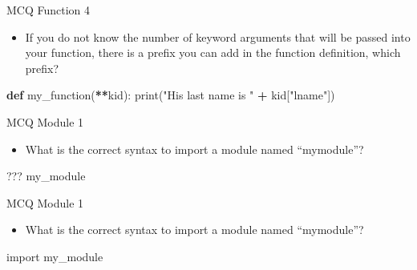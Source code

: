 \documentclass[
  8pt,
  ignorenonframetext,
]{beamer}
\newenvironment{Shaded}{\begin{snugshade}}{\end{snugshade}}
\newcommand{\BuiltInTok}[1]{#1}
\newcommand{\ImportTok}[1]{#1}
\newcommand{\KeywordTok}[1]{\textcolor[rgb]{0.13,0.29,0.53}{\textbf{#1}}}
\newcommand{\NormalTok}[1]{#1}
\newcommand{\OperatorTok}[1]{\textcolor[rgb]{0.81,0.36,0.00}{\textbf{#1}}}
\newcommand{\StringTok}[1]{\textcolor[rgb]{0.31,0.60,0.02}{#1}}
\providecommand{\tightlist}{%
  \setlength{\itemsep}{0pt}\setlength{\parskip}{0pt}}
\begin{document}
\begin{frame}[fragile]{MCQ Function 4}
\protect\hypertarget{mcq-function-4-1}{}
\begin{itemize}
\tightlist
\item
  If you do not know the number of keyword arguments that will be passed
  into your function, there is a prefix you can add in the function
  definition, which prefix?
\end{itemize}

\begin{Shaded}
\begin{Highlighting}[]
\KeywordTok{def}\NormalTok{ my\_function(}\OperatorTok{**}\NormalTok{kid):}
  \BuiltInTok{print}\NormalTok{(}\StringTok{"His last name is "} \OperatorTok{+}\NormalTok{ kid[}\StringTok{"lname"}\NormalTok{])}
\end{Highlighting}
\end{Shaded}
\end{frame}

\begin{frame}[fragile]{MCQ Module 1}
\protect\hypertarget{mcq-module-1}{}
\begin{itemize}
\tightlist
\item
  What is the correct syntax to import a module named ``mymodule''?
\end{itemize}

\begin{Shaded}
\begin{Highlighting}[]
\NormalTok{ ??? my\_module}
\end{Highlighting}
\end{Shaded}
\end{frame}

\begin{frame}[fragile]{MCQ Module 1}
\protect\hypertarget{mcq-module-1-1}{}
\begin{itemize}
\tightlist
\item
  What is the correct syntax to import a module named ``mymodule''?
\end{itemize}

\begin{Shaded}
\begin{Highlighting}[]
\ImportTok{import}\NormalTok{ my\_module}
\end{Highlighting}
\end{Shaded}
\end{frame}
\end{document}
